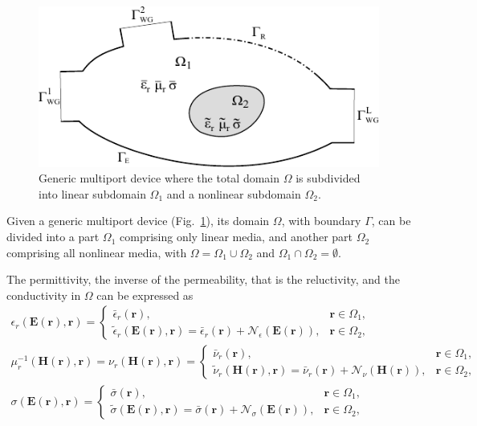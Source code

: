 \begin{figure}[!ht]
\centering
\includegraphics[width=13.4cm]{geometryLarge}
\caption{Generic multiport device where the total domain $\Omega$ is subdivided into linear subdomain $\Omega_1$ and a nonlinear subdomain $\Omega_2$.}
\label{fig:geometry}
\end{figure}

Given a generic multiport device (Fig.~\ref{fig:geometry}), its
domain $\Omega$, with boundary $\Gamma$, can be divided into a part $\Omega_1$ comprising only linear media, and another part $\Omega_2$ comprising all nonlinear media, with $\Omega = \Omega_1 \cup \Omega_2$ and
$\Omega_1 \cap \Omega_2 = \emptyset$.

The permittivity, the inverse of the permeability, that is the reluctivity, and the conductivity in $\Omega$ can be expressed as 
%
\begin{gather}
\epsilon_r(\mathbf{E}(\mathbf{r}),\mathbf{r}) = 
\begin{cases}
\bar{\epsilon}_r(\mathbf{r}), & \mathbf{r} \in \Omega_1,  \\
\tilde{\epsilon}_r(\mathbf{E}(\mathbf{r}), \mathbf{r}) \!=\!
\bar{\epsilon}_r(\mathbf{r}) \!+\! \mathcal{N}_\epsilon(\mathbf{E}(\mathbf{r})), & \mathbf{r} \in
\Omega_2,
\end{cases} \label{eq:epsnl}\\
\mu_r^{-1}(\mathbf{H}(\mathbf{r}),\mathbf{r}) = \nu_r(\mathbf{H}(\mathbf{r}),\mathbf{r}) = 
\begin{cases}
\bar{\nu}_r(\mathbf{r}), & \mathbf{r} \in \Omega_1, \\
\tilde{\nu}_r(\mathbf{H}(\mathbf{r}), \mathbf{r}) \!=\!
\bar{\nu}_r(\mathbf{r}) \!+\! \mathcal{N}_\nu(\mathbf{H}(\mathbf{r})), & \mathbf{r} \in
\Omega_2,
\end{cases}\label{eq:munl}\\
\sigma(\mathbf{E}(\mathbf{r}),\mathbf{r}) = 
\begin{cases}
\bar{\sigma}(\mathbf{r}), & \mathbf{r} \in \Omega_1, \\
\tilde{\sigma}(\mathbf{E}(\mathbf{r}), \mathbf{r}) \!=\!
\bar{\sigma}(\mathbf{r}) \!+\! \mathcal{N}_\sigma(\mathbf{E}(\mathbf{r})), & \mathbf{r} \in
\Omega_2,
\end{cases}\label{eq:signl}
\end{gather}


